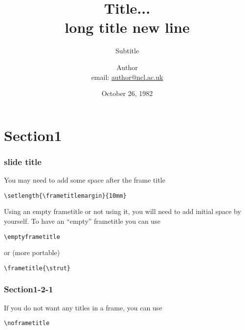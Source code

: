 \documentclass[slidestop,compress,9pt,aspectratio=43]{beamer}
\title[Shorttitle]{\textbf{Title... \\ long title new line}}
\subtitle{Subtitle}
\author[Shortauthor]{Author \\ \small email: \href{mailto:author@ncl.ac.uk}{author@ncl.ac.uk}}
\institute{Newcastle University}
\date[Oct 26]{October 26, 1982}
\begin{document}
\begin{frame}[plain]
\maketitle
\end{frame}



\begin{frame}
\tableofcontents
\end{frame}



\section{Section1}
\begin{frame}[fragile]
\frametitle{slide title}
You may need to add some space after the frame title
\begin{lstlisting}
\setlength{\frametitlemargin}{10mm}
\end{lstlisting}

\pause
\vskip 3mm
Using an empty frametitle or not using it, you will need to add initial space by yourself.
To have an ``empty'' frametitle you can use
\begin{lstlisting}
\emptyframetitle
\end{lstlisting}

\pause
or (more portable)
\begin{lstlisting}
\frametitle{\strut}
\end{lstlisting}
\end{frame}

\subsubsection{Section1-2-1}
\begin{frame}[fragile]
\noframetitle
If you do not want any titles in a frame, you can use
\begin{lstlisting}
\noframetitle
\end{lstlisting}
\end{frame}
\end{document}
